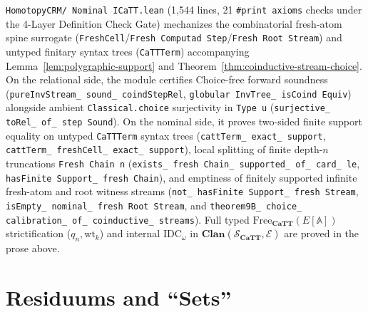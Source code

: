 \texttt{HomotopyCRM/ Nominal ICaTT.lean} (1,544 lines, 21 \texttt{\#print axioms} checks under the 4-Layer Definition Check Gate) mechanizes the combinatorial fresh-atom spine surrogate (\texttt{FreshCell}/\texttt{Fresh Computad Step}/\texttt{Fresh Root Stream}) and untyped finitary syntax trees (\texttt{CaTTTerm}) accompanying Lemma~\ref{lem:polygraphic-support} and Theorem~\ref{thm:coinductive-stream-choice}. On the relational side, the module certifies Choice-free forward soundness (\texttt{pureInvStream\_ sound\_ coindStepRel}, \texttt{globular InvTree\_ isCoind Equiv}) alongside ambient \texttt{Classical.choice} surjectivity in \texttt{Type~u} (\texttt{surjective\_ toRel\_ of\_ step Sound}). On the nominal side, it proves two-sided finite support equality on untyped \texttt{CaTTTerm} syntax trees (\texttt{cattTerm\_ exact\_ support}, \texttt{cattTerm\_ freshCell\_ exact\_ support}), local splitting of finite depth-$n$ truncations \texttt{Fresh Chain n} (\texttt{exists\_ fresh Chain\_ supported\_ of\_ card\_ le}, \texttt{hasFinite Support\_ fresh Chain}), and emptiness of finitely supported infinite fresh-atom and root witness streams (\texttt{not\_ hasFinite Support\_ fresh Stream}, \texttt{isEmpty\_ nominal\_ fresh Root Stream}, and \texttt{theorem9B\_ choice\_ calibration\_ of\_ coinductive\_ streams}). Full typed $\mathrm{Free}_{\mathbf{CaTT}}(E[\mathbb{A}])$ strictification ($q_n, \mathrm{wt}_k$) and internal $\mathrm{IDC}_\omega$ in $\mathbf{Clan}(\mathcal{S}_{\mathbf{CaTT}}, \mathcal{E})$ are proved in the prose above.

\chapter{Residuums and ``$\mathbf{Sets}$''}

\label{ch:sets-residuum}

